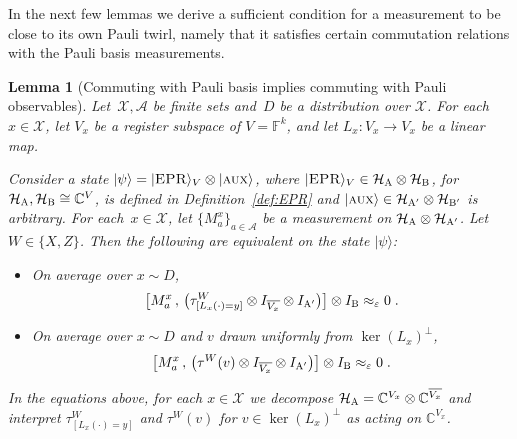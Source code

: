 \documentclass[11pt]{article}
\newtheorem{lemma}[theorem]{Lemma}
\theoremstyle{definition}
\newcommand{\ket}[1]{|#1\rangle}
\newcommand{\Id}{\ensuremath{I}}
\newcommand{\C}{\ensuremath{\mathbb{C}}}
\newcommand{\F}{\ensuremath{\mathbb{F}}}
\newcommand{\mH}{\ensuremath{\mathcal{H}}}
\newcommand{\eps}{\varepsilon}
\newcommand{\labelstyle}[1]{\ensuremath{\textsc{#1}}\xspace}
\newcommand{\EPR}{\labelstyle{EPR}}
\newcommand{\aux}{\labelstyle{aux}}
\newcommand{\alice}{\labelstyle{A}}
\newcommand{\bob}{\labelstyle{B}}
\renewcommand{\cal}[1]{\mathcal{#1}}
\begin{document}
In the next few lemmas we derive a sufficient condition for a measurement to be
close to its own Pauli twirl, namely that it satisfies certain commutation
relations with the Pauli basis measurements.

\begin{lemma}[Commuting with Pauli basis implies commuting with Pauli observables]
  \label{lem:W} 
  Let~$\cal{X},\cal{A}$ be finite sets and~$D$ be a distribution over $\cal{X}$.
  For each~$x \in \cal{X}$, let $V_x$ be a register subspace of $V = \F^k$, and
  let $L_x:V_x \to V_x$ be a linear map.

  Consider a state $\ket{\psi} = \ket{\EPR}_V \otimes \ket{\aux}$, where
  $\ket{\EPR}_{V} \in \mH_\alice \otimes \mH_\bob$, for $\mH_\alice,\mH_\bob
  \cong \C^{V}$, is defined in Definition~\ref{def:EPR} and $\ket{\aux}\in
  \mH_{\alice'} \otimes \mH_{\bob'}$ is arbitrary.
  For each~$x \in \cal{X}$, let $\{M^{x}_a\}_{a \in \cal{A}}$ be a measurement
  on $\mH_{\alice} \otimes \mH_{\alice'}$.
  Let $W\in\{X,Z\}$.
  Then the following are equivalent on the state $\ket{\psi}$:
	\begin{itemize}
	\item On average over $x\sim D$, 
    \begin{equation*}
      \big[ M^x_a \,,\, \big(\tau^W_{[L_x(\cdot)=y]} \otimes \Id_{\overline{V_x}}
      \otimes \Id_{\alice'}\big) \big]  \otimes \Id_\bob \approx_\eps 0\;.
    \end{equation*}
  \item On average over $x \sim D$ and $v$ drawn uniformly from $\ker
    (L_x)^\perp$,
    \begin{equation*}
      \big[ M^x_a \,,\, \big( \tau^W(v) \otimes \Id_{\overline{V_x}} \otimes
      \Id_{\alice'} \big) \big]  \otimes \Id_\bob \approx_\eps 0\;.
    \end{equation*}
	\end{itemize}
	In the equations above, for each $x \in \cal{X}$ we decompose $\mH_\alice = \C^{V_x} \otimes \C^{\overline{V_x}}$ and interpret $\tau^W_{[L_x(\cdot)=y]}$ and $\tau^W(v)$ for $v \in \ker(L_x)^\perp$ as acting on $\C^{V_x}$. 
\end{lemma}
\end{document}
